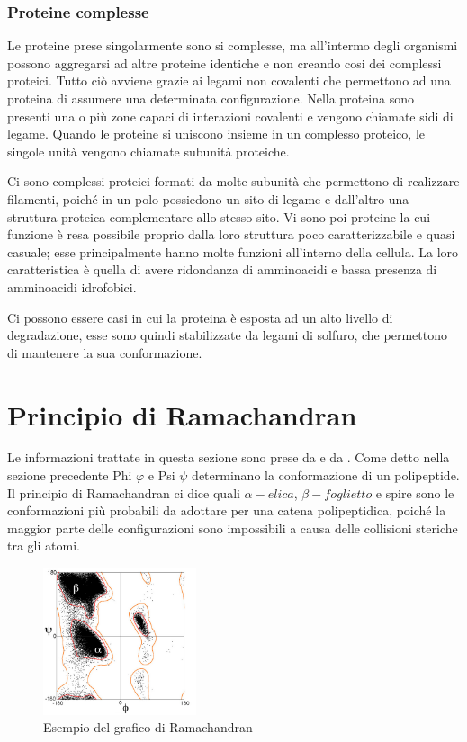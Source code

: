 \subsubsection{Proteine complesse}\label{subsec:es_subsec}
Le proteine prese singolarmente sono si complesse, ma all'intermo degli organismi possono aggregarsi ad altre proteine identiche e non creando cosi dei complessi
proteici. Tutto ciò avviene grazie ai legami non covalenti che permettono ad una proteina di assumere una determinata configurazione. Nella proteina sono presenti 
una o più zone capaci di interazioni covalenti e vengono chiamate sidi di legame. Quando le proteine si uniscono insieme in un complesso proteico, le singole unità 
vengono chiamate subunità proteiche.

Ci sono complessi proteici formati da molte subunità che permettono di realizzare filamenti, poiché in un polo possiedono un sito di legame e dall'altro una struttura
proteica complementare allo stesso sito. Vi sono poi proteine la cui funzione è resa possibile proprio dalla loro struttura poco caratterizzabile e quasi casuale;
esse principalmente hanno molte funzioni all'interno della cellula. La loro caratteristica è quella di avere ridondanza di amminoacidi e bassa presenza di 
amminoacidi idrofobici. 

Ci possono essere casi in cui la proteina è esposta ad un alto livello di degradazione, esse sono quindi stabilizzate da legami di solfuro, che permettono di 
mantenere la sua conformazione.

\section{Principio di Ramachandran}\label{sec:cap_sec_subsec}
Le informazioni trattate in questa sezione sono prese da \cite{SlideRamachandran} e da \cite{TutorialRamachandran}.
Come detto nella sezione precedente Phi $\varphi$ e Psi $\psi$ determinano la conformazione di un polipeptide. Il principio di Ramachandran ci dice quali $\alpha-elica$, 
$\beta-foglietto$ e spire sono le conformazioni più probabili da adottare per una catena polipeptidica, poiché la maggior parte delle configurazioni sono 
impossibili a causa delle collisioni steriche tra gli atomi. 

\begin{figure}
    \centering
    \includegraphics[width=0.4\textwidth]{Immagini/GraficoRamachandran.png}
    \caption{Esempio del grafico di Ramachandran}
    \label{fig:graficoRamachandran}
\end{figure}


